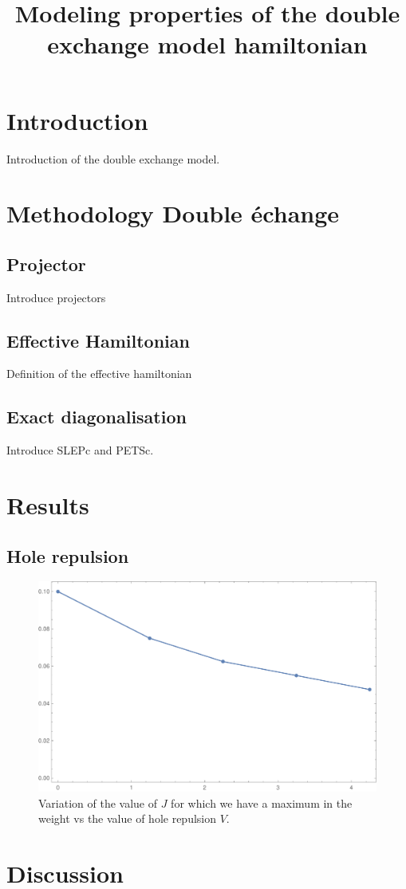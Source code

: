 \documentclass[ openright,titlepage,numbers=noenddot,headinclude,twoside,%
                footinclude=true,cleardoublepage=empty,abstractoff,%
                BCOR=5mm,paper=a4,fontsize=11pt,%
                ngerman,american,%
]{scrreprt}
\title{Modeling properties of the double exchange model hamiltonian}
\begin{document}
\maketitle
\thispagestyle{fancy}
\section{Introduction}

Introduction of the double exchange model.

\section{Methodology Double échange}

\subsection{Projector}

Introduce projectors

\subsection{Effective Hamiltonian}

Definition of the effective hamiltonian

\subsection{Exact diagonalisation}

Introduce SLEPc and PETSc.

\section{Results}

\subsection{Hole repulsion}

\begin{figure}[ht]
    \centering
    \includegraphics[scale=0.5]{"12_4h_J_wmax_vs_xrep.pdf"}
    \caption{\label{fig:}Variation of the value of $J$ for which we have a maximum in the weight vs the value of hole repulsion $V$. }
\end{figure}

\section{Discussion}
\end{document}
